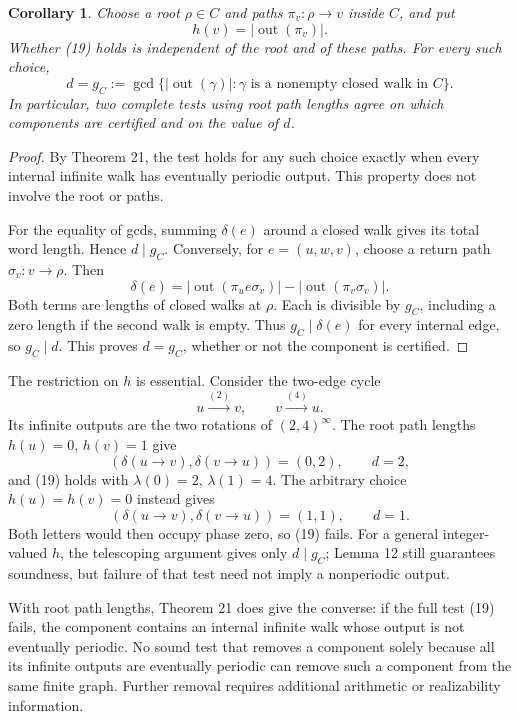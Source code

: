 \documentclass[11pt,reqno]{amsart}
\newtheorem{corollary}[theorem]{Corollary}
\theoremstyle{definition}
\theoremstyle{remark}
\begin{document}
\begin{samepage}
\begin{corollary}\leavevmode\label{thm:22}
Choose a root \(\rho\in C\) and paths
\(\pi_v:\rho\to v\) inside \(C\), and put
\[
h(v)=|\operatorname{out}(\pi_v)|.
\]
Whether (19) holds is independent of the root and of these paths.
For every such choice,
\[
d=g_C:=\gcd\bigl\{|\operatorname{out}(\gamma)|:
\gamma\text{ is a nonempty closed walk in }C\bigr\}.
\]
In particular, two complete tests using root path lengths agree on
which components are certified and on the value of \(d\).
\label{thm-end:22}
\end{corollary}
\end{samepage}

\begin{proof}\leavevmode\label{proof:22}
By Theorem 21, the test holds for any such choice exactly
when every internal infinite walk has eventually periodic output.
This property does not involve the root or paths.

For the equality of gcds, summing \(\delta(e)\) around a closed walk
gives its total word length. Hence \(d\mid g_C\). Conversely, for
\(e=(u,w,v)\), choose a return path \(\sigma_v:v\to\rho\). Then
\[
\delta(e)
=|\operatorname{out}(\pi_u e\sigma_v)|
 -|\operatorname{out}(\pi_v\sigma_v)|.
\]
Both terms are lengths of closed walks at \(\rho\). Each is divisible
by \(g_C\), including a zero length if the second walk is empty.
Thus \(g_C\mid\delta(e)\) for every internal edge, so \(g_C\mid d\).
This proves \(d=g_C\), whether or not the component is certified. \qedhere
\end{proof}

The restriction on \(h\) is essential. Consider the two-edge cycle
\[
u\xrightarrow{(2)}v,\qquad v\xrightarrow{(4)}u.
\]
Its infinite outputs are the two rotations of \((2,4)^\infty\).
The root path lengths \(h(u)=0\), \(h(v)=1\) give
\[
(\delta(u\to v),\delta(v\to u))=(0,2),\qquad d=2,
\]
and (19) holds with \(\lambda(0)=2\), \(\lambda(1)=4\).
The arbitrary choice \(h(u)=h(v)=0\) instead gives
\[
(\delta(u\to v),\delta(v\to u))=(1,1),\qquad d=1.
\]
Both letters would then occupy phase zero, so (19) fails. For a
general integer-valued \(h\), the telescoping argument gives only
\(d\mid g_C\); Lemma 12 still guarantees soundness, but failure of
that test need not imply a nonperiodic output.

With root path lengths, Theorem 21 does give the converse: if the full
test (19) fails, the component contains an internal infinite walk whose
output is not eventually periodic. No sound test that removes a
component solely because all its infinite outputs are eventually
periodic can remove such a component from the same finite graph.
Further removal requires additional arithmetic or realizability
information.
\end{document}
